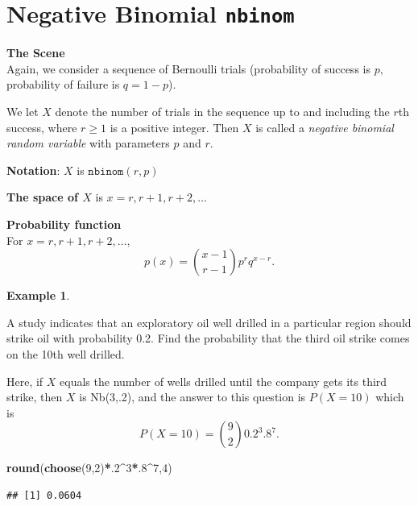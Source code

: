 \documentclass[
]{book}
\newenvironment{Shaded}{\begin{snugshade}}{\end{snugshade}}
\newcommand{\DecValTok}[1]{\textcolor[rgb]{0.00,0.00,0.81}{#1}}
\newcommand{\FunctionTok}[1]{\textcolor[rgb]{0.13,0.29,0.53}{\textbf{#1}}}
\newcommand{\NormalTok}[1]{#1}
\newcommand{\SpecialCharTok}[1]{\textcolor[rgb]{0.81,0.36,0.00}{\textbf{#1}}}
\theoremstyle{definition}
\theoremstyle{definition}
\newtheorem{example}{Example}[chapter]
\theoremstyle{definition}
\theoremstyle{definition}
\theoremstyle{remark}
\begin{document}
\section{\texorpdfstring{Negative Binomial \texttt{nbinom}}{Negative Binomial nbinom}}\label{negbinomR}

\textbf{The Scene}\\
Again, we consider a sequence of Bernoulli trials (probability of success is \(p,\) probability of failure is \(q = 1-p\)).

We let \(X\) denote the number of trials in the sequence up to and including the \(r\)th success, where \(r \geq 1\) is a positive integer. Then \(X\) is called a \emph{negative binomial random variable} with parameters \(p\) and \(r\).

\textbf{Notation}: \(X\) is \(\texttt{nbinom}(r,p)\)

\textbf{The space of \(X\)} is \(x = r, r+1, r+2, \ldots\)

\textbf{Probability function}\\
For \(x = r, r+1, r+2, \ldots ,\) \[p(x)= \binom{x-1}{r-1}p^{r}q^{x-r}.\]

\begin{example}
\protect\hypertarget{exm:drill-oil-negbinom-R}{}\label{exm:drill-oil-negbinom-R}

A study indicates that an exploratory oil well drilled in a particular region should strike oil with probability 0.2. Find the probability that the third oil strike comes on the 10th well drilled.

Here, if \(X\) equals the number of wells drilled until the company gets its third strike, then \(X\) is Nb(3,.2), and the answer to this question is \(P(X=10)\) which is \[P(X=10)=\binom{9}{2}0.2^{3}.8^{7}.\]

\begin{Shaded}
\begin{Highlighting}[]
\FunctionTok{round}\NormalTok{(}\FunctionTok{choose}\NormalTok{(}\DecValTok{9}\NormalTok{,}\DecValTok{2}\NormalTok{)}\SpecialCharTok{*}\NormalTok{.}\DecValTok{2}\SpecialCharTok{\^{}}\DecValTok{3}\SpecialCharTok{*}\NormalTok{.}\DecValTok{8}\SpecialCharTok{\^{}}\DecValTok{7}\NormalTok{,}\DecValTok{4}\NormalTok{)}
\end{Highlighting}
\end{Shaded}

\begin{verbatim}
## [1] 0.0604
\end{verbatim}

\end{example}
\end{document}
